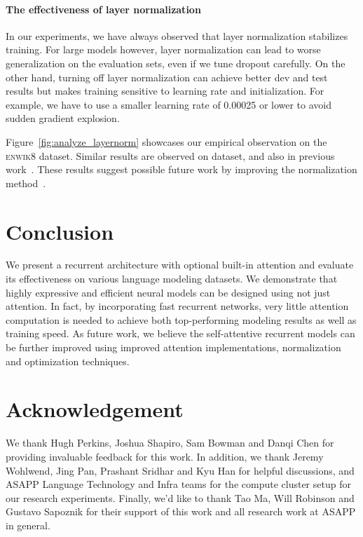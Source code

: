 \documentclass[11pt,a4paper]{article}
\begin{document}
\paragraph{The effectiveness of layer normalization}
In our experiments, we have always observed that layer normalization stabilizes training.
For large models however, layer normalization can lead to worse generalization on the evaluation sets, even if we tune dropout carefully.
On the other hand, turning off layer normalization can achieve better dev and test results but makes training sensitive to learning rate and initialization.
For example, we have to use a smaller learning rate of 0.00025 or lower to avoid sudden gradient explosion.

Figure~\ref{fig:analyze_layernorm} showcases our empirical observation on the \textsc{enwik8} dataset. 
Similar results are observed on  dataset, and also in previous work~\cite{xu2019understanding}.
These results suggest possible future work by improving the normalization method~\cite{shen2020powernorm,brock2021characterizing}.
 \section{Conclusion}
We present a recurrent architecture with optional built-in attention and evaluate its effectiveness on various language modeling datasets.
We demonstrate that highly expressive and efficient neural models can be designed using not just attention.
In fact, by incorporating fast recurrent networks, very little attention computation is needed to achieve both top-performing modeling results as well as training speed.
As future work, we believe the self-attentive recurrent models can be further improved using improved attention implementations, normalization and optimization techniques. \section*{Acknowledgement}
We thank Hugh Perkins, Joshua Shapiro, Sam Bowman and Danqi Chen for providing invaluable feedback for this work.
In addition, we thank Jeremy Wohlwend, Jing Pan, Prashant Sridhar and Kyu Han for helpful discussions, and ASAPP Language Technology and Infra teams for the compute cluster setup for our research experiments.
Finally, we'd like to thank Tao Ma, Will Robinson and Gustavo Sapoznik for their support of this work and all research work at ASAPP in general. 

\end{document}
